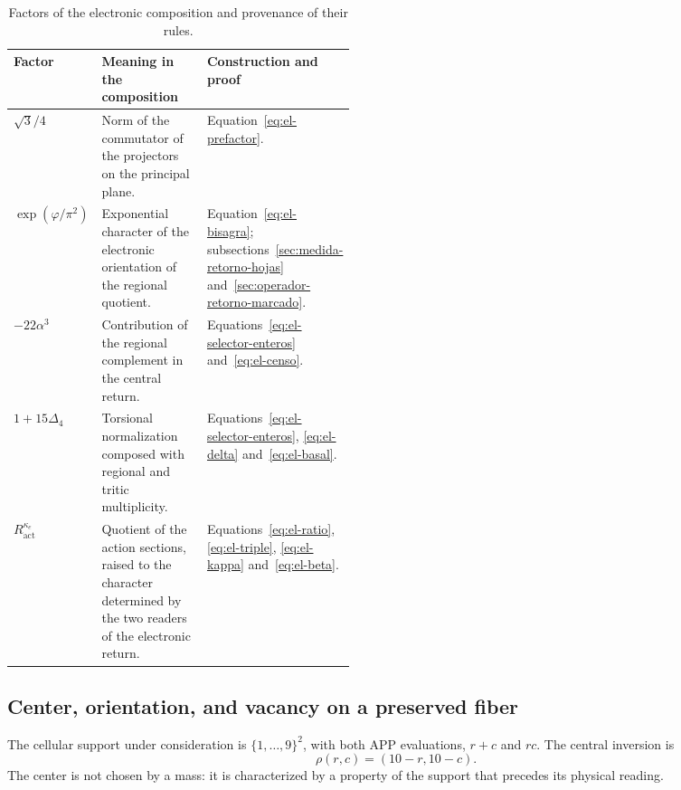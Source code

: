 \begin{table}[htbp]
\centering
\small
\setlength{\tabcolsep}{4pt}
\renewcommand{\arraystretch}{1.18}
\begin{tabularx}{\linewidth}{@{}p{0.20\linewidth}Xp{0.24\linewidth}@{}}
\toprule
Factor & Meaning in the composition & Construction and proof\\
\midrule
\(\sqrt3/4\)
 & Norm of the commutator of the projectors on the principal plane.
 & Equation~\eqref{eq:el-prefactor}.\\
\(\exp(\varphi/\pi^2)\)
 & Exponential character of the electronic orientation of the regional quotient.
 & Equation~\eqref{eq:el-bisagra}; subsections~\ref{sec:medida-retorno-hojas}
   and~\ref{sec:operador-retorno-marcado}.\\
\(-22\alpha^3\)
 & Contribution of the regional complement in the central return.
 & Equations~\eqref{eq:el-selector-enteros} and~\eqref{eq:el-censo}.\\
\(1+15\Delta_4\)
 & Torsional normalization composed with regional and tritic multiplicity.
 & Equations~\eqref{eq:el-selector-enteros}, \eqref{eq:el-delta}
   and~\eqref{eq:el-basal}.\\
\(R_{\mathrm{act}}^{\kappa_e}\)
 & Quotient of the action sections, raised to the character determined
   by the two readers of the electronic return.
 & Equations~\eqref{eq:el-ratio}, \eqref{eq:el-triple},
   \eqref{eq:el-kappa} and~\eqref{eq:el-beta}.\\
\bottomrule
\end{tabularx}
\caption{Factors of the electronic composition and provenance of their rules.}
\label{tab:el-factores}
\end{table}



\subsection{Center, orientation, and vacancy on a preserved fiber}

The cellular support under consideration is \(\{1,\ldots,9\}^2\), with both
APP evaluations, \(r+c\) and \(rc\). The central inversion is
\begin{equation}
 \rho(r,c)=(10-r,10-c).
 \label{eq:el-inversion-central}
\end{equation}
The center is not chosen by a mass: it is characterized by a property of
the support that precedes its physical reading.

